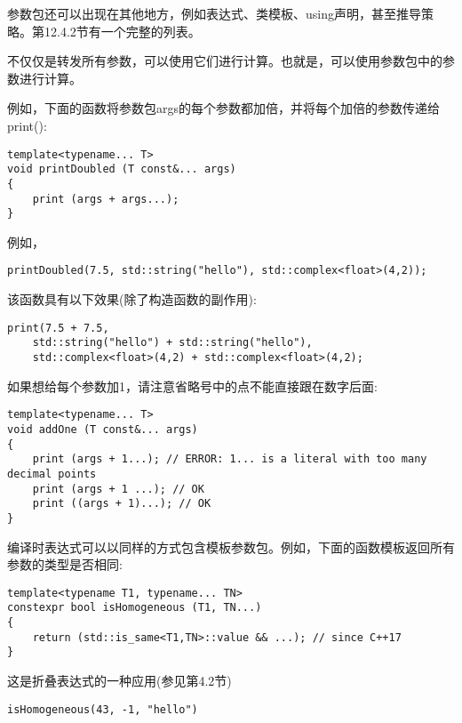 
参数包还可以出现在其他地方，例如表达式、类模板、using声明，甚至推导策略。第12.4.2节有一个完整的列表。


不仅仅是转发所有参数，可以使用它们进行计算。也就是，可以使用参数包中的参数进行计算。

例如，下面的函数将参数包args的每个参数都加倍，并将每个加倍的参数传递给print():

\begin{lstlisting}[style=styleCXX]
template<typename... T>
void printDoubled (T const&... args)
{
	print (args + args...);
}
\end{lstlisting}

例如，

\begin{lstlisting}[style=styleCXX]
printDoubled(7.5, std::string("hello"), std::complex<float>(4,2));
\end{lstlisting}

该函数具有以下效果(除了构造函数的副作用):

\begin{lstlisting}[style=styleCXX]
print(7.5 + 7.5,
	std::string("hello") + std::string("hello"),
	std::complex<float>(4,2) + std::complex<float>(4,2);
\end{lstlisting}

如果想给每个参数加1，请注意省略号中的点不能直接跟在数字后面:

\begin{lstlisting}[style=styleCXX]
template<typename... T>
void addOne (T const&... args)
{
	print (args + 1...); // ERROR: 1... is a literal with too many decimal points
	print (args + 1 ...); // OK
	print ((args + 1)...); // OK
}
\end{lstlisting}

编译时表达式可以以同样的方式包含模板参数包。例如，下面的函数模板返回所有参数的类型是否相同:

\begin{lstlisting}[style=styleCXX]
template<typename T1, typename... TN>
constexpr bool isHomogeneous (T1, TN...)
{
	return (std::is_same<T1,TN>::value && ...); // since C++17
}
\end{lstlisting}

这是折叠表达式的一种应用(参见第4.2节)

\begin{lstlisting}[style=styleCXX]
isHomogeneous(43, -1, "hello")
\end{lstlisting}

